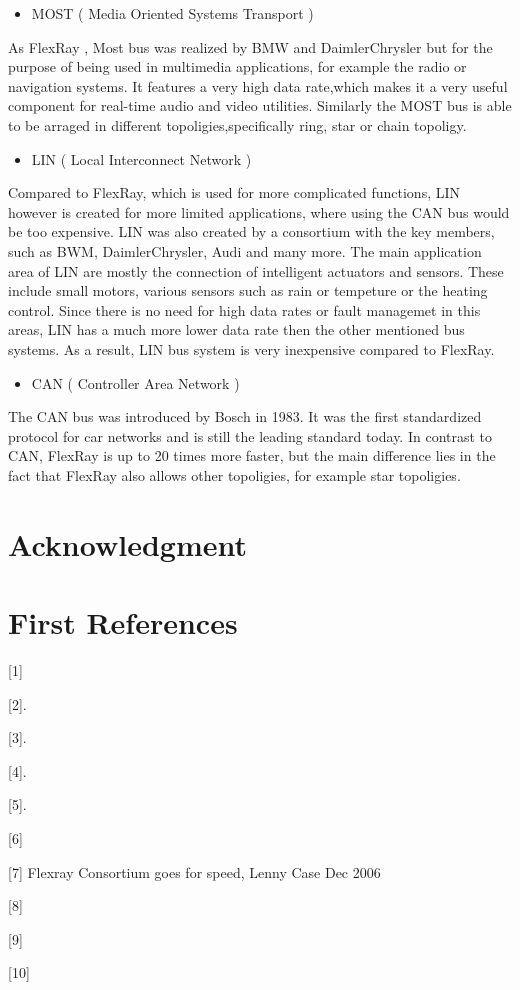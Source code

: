 \documentclass[conference]{IEEEtran}
\begin{document}
\begin{itemize}
  \item MOST ( Media Oriented Systems Transport )
\end{itemize}
As FlexRay , Most bus was realized by BMW and DaimlerChrysler but for the purpose of being used in multimedia applications, for example the radio or navigation systems. It features a very high data rate,which makes it a very useful component for real-time audio and video utilities. Similarly the MOST bus is able to be arraged in different topoligies,specifically ring, star or chain topoligy.


\begin{itemize}
  \item LIN ( Local Interconnect Network )
\end{itemize}
Compared to FlexRay, which is used for more complicated functions, LIN however is created for more limited applications, where using the CAN bus would be too expensive. LIN was also created by a consortium with the key members, such as BWM, DaimlerChrysler, Audi and many more. The main application area of LIN are mostly the connection of intelligent actuators and sensors. These include small motors, various sensors such as rain or tempeture or the heating control. Since there is no need for high data rates or fault managemet in this areas, LIN has a much more lower data rate then the other mentioned bus systems. As a result, LIN bus system is very inexpensive compared to FlexRay.

\begin{itemize}
  \item CAN ( Controller Area Network )
\end{itemize}

The CAN bus was introduced by Bosch in 1983. It was the first standardized protocol for car networks and is still the leading standard today. In contrast to CAN, FlexRay is up to 20 times more faster, but the main difference lies in the fact that FlexRay also allows other topoligies, for example star topoligies.

\section*{Acknowledgment}

\section{First References}
[1]\cite{reichart2005flexray}

[2]\cite{vaz2020efficient}.

[3]\cite{steinbach2010comparing}.

[4]\cite{makowitz2006flexray}.

[5]\cite{enosh2014efficient}.

[6]\cite{kopetz2001comparison}

[7] Flexray Consortium goes for speed, Lenny Case Dec 2006

[8]\cite{rausch2007flexray}

[9]\cite{xu2008implementation}


[10]\cite{shaw2008introduction}


\end{document}
